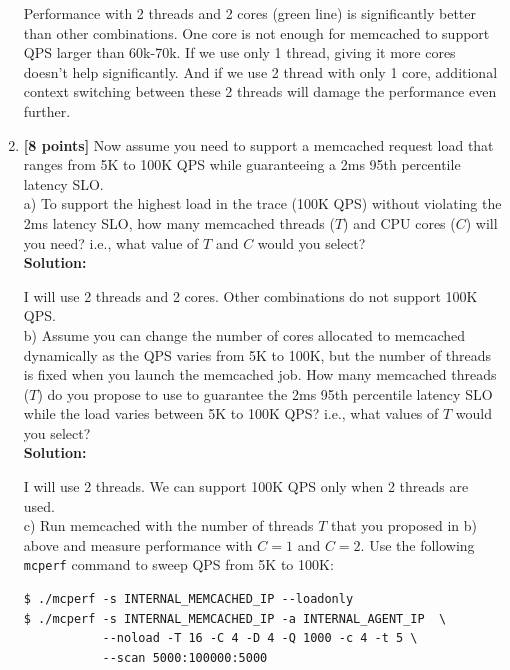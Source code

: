 \documentclass[11pt]{article}
\begin{document}
\begin{enumerate}
    Performance with 2 threads and 2 cores (green line) is significantly better than other combinations. One core is not enough for memcached to support QPS larger than 60k-70k. If we use only 1 thread, giving it more cores doesn't help significantly. And if we use 2 thread with only 1 core, additional context switching between these 2 threads will damage the performance even further.

    \item \textbf{[8 points]} Now assume you need to support a memcached request load that ranges from 5K to 100K QPS while guaranteeing a 2ms 95th percentile latency SLO. \\
    

    
    a) To support the highest load in the trace (100K QPS) without violating the 2ms latency SLO, how many memcached threads ($T$) and CPU cores ($C$) will you need? i.e., what value of $T$ and $C$ would you select? \\
    
    \textbf{Solution:}
    
    I will use 2 threads and 2 cores. Other combinations do not support 100K QPS.\\
    
    b) Assume you can change the number of cores allocated to memcached dynamically as the QPS varies from 5K to 100K, but the number of threads is fixed when you launch the memcached job. How many memcached threads ($T$) do you propose to use to guarantee the 2ms 95th percentile latency SLO while the load varies between 5K to 100K QPS? i.e., what values of $T$ would you select? \\
    
    \textbf{Solution:}
    
    I will use 2 threads. We can support 100K QPS only when 2 threads are used.\\
    
    c) Run memcached with the number of threads $T$ that you proposed in b) above and measure performance with $C=1$ and $C=2$. Use the following \texttt{mcperf} command to sweep QPS from 5K to 100K:
    
    \begin{Verbatim}[fontsize=\small]
$ ./mcperf -s INTERNAL_MEMCACHED_IP --loadonly 
$ ./mcperf -s INTERNAL_MEMCACHED_IP -a INTERNAL_AGENT_IP  \
           --noload -T 16 -C 4 -D 4 -Q 1000 -c 4 -t 5 \ 
           --scan 5000:100000:5000
\end{Verbatim}


\end{enumerate}
\end{document}

